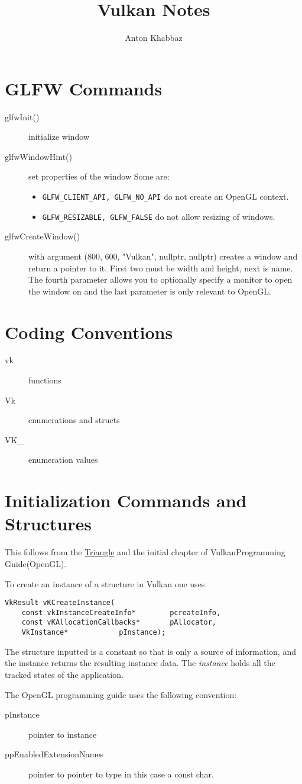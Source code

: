 \documentclass{article}
\title{Vulkan Notes}
\author{Anton Khabbaz}
\begin{document}
\maketitle
\section{GLFW Commands}
\begin{description}
\item[ glfwInit()] initialize window
\item[glfwWindowHint()] set properties of the window Some are:
	\begin{itemize}
		\item \verb|GLFW_CLIENT_API, GLFW_NO_API| do not create an
OpenGL context.
		\item \verb|GLFW_RESIZABLE, GLFW_FALSE| do not allow resizing of
windows.
	\end{itemize}
\item [glfwCreateWindow()] with argument 
 (800, 600, "Vulkan", nullptr, nullptr) creates a window
and return a pointer to it.  First two must be width and height, next is name.
The fourth parameter allows you to optionally specify a monitor to open the
window on and the last parameter is only relevant to OpenGL.	
\end{description}
\section{Coding Conventions}
\begin{description}
\item[vk] functions
\item[Vk] enumerations and structs
\item[VK\_] enumeration values
\end{description}
\section{Initialization Commands and Structures}
This follows from the
\href{https://vulkan-tutorial.com/en/Drawing\_a\_triangle/Setup/Instance}{Triangle}
and the initial chapter of VulkanProgramming Guide(OpenGL).  

To create an instance of a structure in Vulkan one uses
\begin{verbatim}
VkResult vKCreateInstance( 
	const vkInstanceCreateInfo*        pcreateInfo,
	const vKAllocationCallbacks*       pAllocator,
	VkInstance*			   pInstance);
\end{verbatim}

The structure inputted is a constant so that is only a source of information, and the
instance returns the resulting instance data.  The \emph{instance} holds all the
tracked states of the application.

The OpenGL programming guide uses the following convention:
\begin{description}
	\item[pInstance]  pointer to instance
	\item[ppEnabledExtensionNames] pointer to pointer to type in this case a
		const char.
\end{description}
\end{document}
